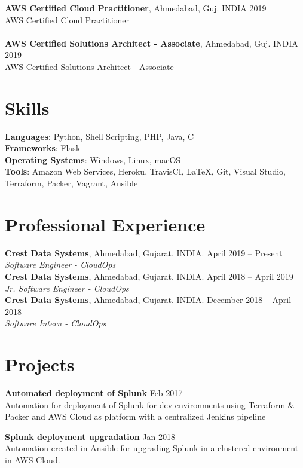 \documentclass[margin,line]{res}
\begin{document}
\begin{resume}
{\bf AWS Certified Cloud Practitioner}, Ahmedabad, Guj. INDIA \hfill{2019}\\
AWS Certified Cloud Practitioner\\\\
{\bf AWS Certified Solutions Architect - Associate}, Ahmedabad, Guj. INDIA \hfill{2019}\\
AWS Certified Solutions Architect - Associate

\section{\sc Skills}
{\bf Languages}: Python, Shell Scripting, PHP, Java, C\\
{\bf Frameworks}: Flask\\ 
{\bf Operating Systems}: Windows, Linux, macOS\\
{\bf Tools}: Amazon Web Services, Heroku, TravisCI, \LaTeX, Git, Visual Studio, Terraform, Packer, Vagrant, Ansible\\

\section{\sc Professional Experience}
{\bf Crest Data Systems}, Ahmedabad, Gujarat. INDIA. \hfill{April 2019 -- Present}\\
{\em Software Engineer - CloudOps}\\
{\bf Crest Data Systems}, Ahmedabad, Gujarat. INDIA. \hfill{April 2018 -- April 2019}\\
{\em Jr. Software Engineer - CloudOps}\\
{\bf Crest Data Systems}, Ahmedabad, Gujarat. INDIA. \hfill{December 2018 -- April 2018}\\
{\em Software Intern - CloudOps}\\

\section{\sc Projects}

{\bf Automated deployment of Splunk} \hfill{Feb 2017}\\
Automation for deployment of Splunk for dev environments using Terraform \& Packer and AWS Cloud as platform with a centralized Jenkins pipeline

{\bf Splunk deployment upgradation} \hfill{Jan 2018}\\
Automation created in Ansible for upgrading Splunk in a clustered environment in AWS Cloud.


\end{resume}
\end{document}
